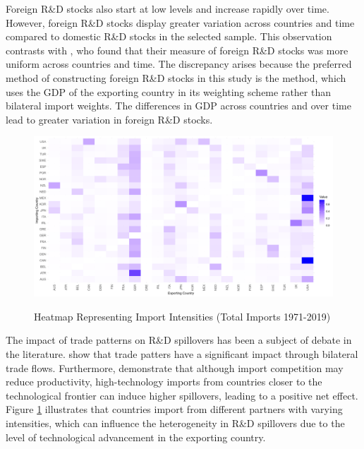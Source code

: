 \documentclass[12pt]{article}
\begin{document}
Foreign R\&D stocks also start at low levels and increase rapidly over time. However, foreign R\&D stocks display greater variation across countries and time compared to domestic R\&D stocks in the selected sample. This observation contrasts with \citet{Coe2009}, who found that their measure of foreign R\&D stocks was more uniform across countries and time. The discrepancy arises because the preferred method of constructing foreign R\&D stocks in this study is the \citet{Lichtenberg1998} method, which uses the GDP of the exporting country in its weighting scheme rather than bilateral import weights. The differences in GDP across countries and over time lead to greater variation in foreign R\&D stocks.

\begin{figure}[h!]
    \centering
    \caption{Heatmap Representing Import Intensities (Total Imports 1971-2019)}
    \includegraphics[width=1\linewidth]{heatmap.png}
    \label{fig: heatmap}
    \doublespacing
\end{figure}

The impact of trade patterns on R\&D spillovers has been a subject of debate in the literature. \citet{Fracasso2015} show that trade patters have a significant impact through bilateral trade flows. Furthermore, \citet{Acharya2008} demonstrate that although import competition may reduce productivity, high-technology imports from countries closer to the technological frontier can induce higher spillovers, leading to a positive net effect. Figure \ref{fig: heatmap} illustrates that countries import from different partners with varying intensities, which can influence the heterogeneity in R\&D spillovers due to the level of technological advancement in the exporting country.
\end{document}
